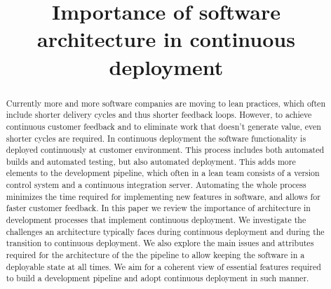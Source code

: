 \documentclass[conference]{IEEEtran}
\begin{document}
\title{Importance of software architecture in continuous deployment}

\author{
}

\maketitle


\begin{abstract}
Currently more and more software companies are moving to lean practices, which often include shorter delivery cycles and thus shorter feedback loops. However, to achieve continuous customer feedback and to eliminate work that doesn't generate value, even shorter cycles are required. In continuous deployment the software functionality is deployed continuously at customer environment. This process includes both automated builds and automated testing, but also automated deployment. This adds more elements to the development pipeline, which often in a lean team consists of a version control system and a continuous integration server. Automating the whole process minimizes the time required for implementing new features in software, and allows for faster customer feedback. In this paper we review the importance of architecture in development processes that implement continuous deployment. We investigate the challenges an architecture typically faces during continuous deployment and during the transition to continuous deployment. We also explore the main issues and attributes required for the architecture of the the pipeline to allow keeping the software in a deployable state at all times. We aim for a coherent view of essential features required to build a development pipeline and adopt continuous deployment in such manner. 
\end{abstract}

\end{document}
